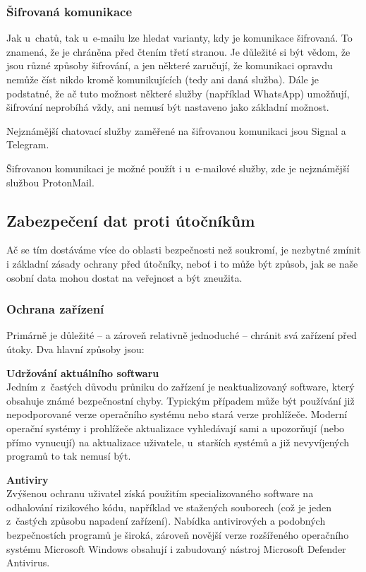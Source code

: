 \subsubsection*{Šifrovaná komunikace}
Jak u~chatů, tak u~e-mailu lze hledat varianty, kdy je komunikace šifrovaná. To znamená, že je chráněna před čtením třetí stranou. Je důležité si být vědom, že jsou různé způsoby šifrování, a jen některé zaručují, že komunikaci opravdu nemůže číst nikdo kromě komunikujících (tedy ani daná služba). Dále je podstatné, že ač tuto možnost některé služby (například WhatsApp) umožňují, šifrování neprobíhá vždy, ani nemusí být nastaveno jako základní možnost.

Nejznámější chatovací služby zaměřené na šifrovanou komunikaci jsou Signal a Telegram.

Šifrovanou komunikaci je možné použít i u~e-mailové služby, zde je nejznámější službou ProtonMail. 


\subsection{Zabezpečení dat proti útočníkům}
Ač se tím dostáváme více do oblasti bezpečnosti než soukromí, je nezbytné zmínit i základní zásady ochrany před útočníky, neboť i to může být způsob, jak se naše osobní data mohou dostat na veřejnost a být zneužita.

\subsubsection*{Ochrana zařízení}
Primárně je důležité -- a zároveň relativně jednoduché -- chránit svá zařízení před útoky. Dva hlavní způsoby jsou:

\textbf{Udržování aktuálního softwaru}\\
Jedním z~častých důvodu průniku do zařízení je neaktualizovaný software, který obsahuje známé bezpečnostní chyby. Typickým případem může být používání již nepodporované verze operačního systému nebo stará verze prohlížeče. Moderní operační systémy i prohlížeče aktualizace vyhledávají sami a upozorňují (nebo přímo vynucují) na aktualizace uživatele, u~starších systémů a již nevyvíjených programů to tak nemusí být.

\textbf{Antiviry}\\
Zvýšenou ochranu uživatel získá použitím specializovaného software na odhalování rizikového kódu, například ve stažených souborech (což je jeden z~častých způsobu napadení zařízení). Nabídka antivirových a podobných bezpečnostích programů je široká, zároveň novější verze rozšířeného operačního systému Microsoft Windows obsahují i zabudovaný nástroj Microsoft Defender Antivirus.

